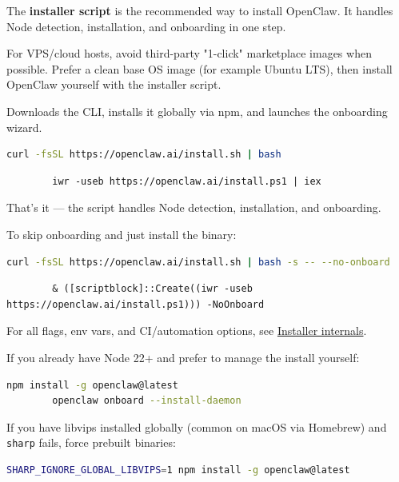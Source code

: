 The \textbf{installer script} is the recommended way to install OpenClaw. It handles Node detection, installation, and onboarding in one step.

For VPS/cloud hosts, avoid third-party "1-click" marketplace images when possible. Prefer a clean base OS image (for example Ubuntu LTS), then install OpenClaw yourself with the installer script.

Downloads the CLI, installs it globally via npm, and launches the onboarding wizard.

\begin{lstlisting}[language=bash]
        curl -fsSL https://openclaw.ai/install.sh | bash
\end{lstlisting}

\begin{lstlisting}
        iwr -useb https://openclaw.ai/install.ps1 | iex
\end{lstlisting}


That's it — the script handles Node detection, installation, and onboarding.

To skip onboarding and just install the binary:

\begin{lstlisting}[language=bash]
        curl -fsSL https://openclaw.ai/install.sh | bash -s -- --no-onboard
\end{lstlisting}

\begin{lstlisting}
        & ([scriptblock]::Create((iwr -useb https://openclaw.ai/install.ps1))) -NoOnboard
\end{lstlisting}


For all flags, env vars, and CI/automation options, see \href{/install/installer}{Installer internals}.


If you already have Node 22+ and prefer to manage the install yourself:

\begin{lstlisting}[language=bash]
        npm install -g openclaw@latest
        openclaw onboard --install-daemon
\end{lstlisting}


If you have libvips installed globally (common on macOS via Homebrew) and \texttt{sharp} fails, force prebuilt binaries:

\begin{lstlisting}[language=bash]
          SHARP_IGNORE_GLOBAL_LIBVIPS=1 npm install -g openclaw@latest
\end{lstlisting}


